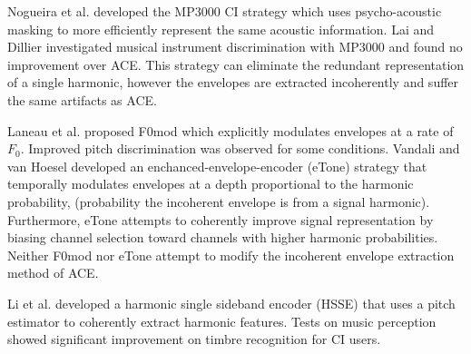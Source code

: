 \documentclass [11pt, proquest,oneside] {ganter_thesis}[2015/03/03]
\begin{document}
Nogueira et al. \cite{nogueira2005psychoacoustic} developed the MP3000 CI strategy which uses psycho-acoustic masking to more efficiently represent the same acoustic information.  Lai and Dillier \cite{lai2008investigating} investigated musical instrument discrimination with MP3000 and found no improvement over ACE.  This strategy can eliminate the redundant representation of a single harmonic, however the envelopes are extracted incoherently and suffer the same artifacts as ACE.

Laneau et al. \cite{laneau2006improved} proposed F0mod which explicitly modulates envelopes at a rate of $F_0$.  Improved pitch discrimination was observed for some conditions.  Vandali and van Hoesel \cite{vandali2011development} developed an enchanced-envelope-encoder (eTone) strategy that temporally modulates envelopes at a depth proportional to the harmonic probability, (probability the incoherent envelope is from a signal harmonic).  Furthermore, eTone attempts to coherently improve signal representation by biasing channel selection toward channels with higher harmonic probabilities.  Neither F0mod nor eTone attempt to modify the incoherent envelope extraction method of ACE.

Li et al. \cite{li2010harmonic} developed a harmonic single sideband encoder (HSSE) that uses a pitch estimator to coherently extract harmonic features.  Tests on music perception \cite{li2013improved} showed significant improvement on timbre recognition for CI users.





\end{document}
